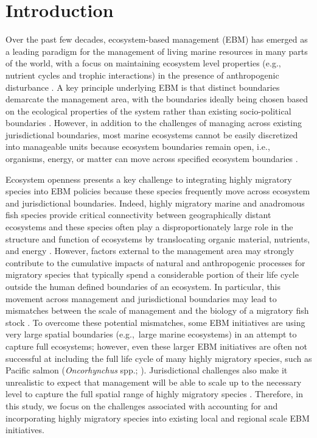 \section{Introduction}

Over the past few decades, ecosystem-based management (EBM) has emerged as a
leading paradigm for the management of living marine resources in many parts of
the world, with a focus on maintaining ecosystem level properties (e.g.,
nutrient cycles and trophic interactions) in the presence of anthropogenic
disturbance \citep{Engler2015, Skjoldal2008, Fletcher2008, Constable2011,
Olsson2008}. A key principle underlying EBM is that distinct boundaries
demarcate the management area, with the boundaries ideally being chosen based on
the ecological properties of the system rather than existing socio-political
boundaries \citep{Long2015, Engler2015}. However, in addition to the challenges
of managing across existing jurisdictional boundaries, most marine ecosystems
cannot be easily discretized into manageable units because ecosystem boundaries
remain open, i.e., organisms, energy, or matter can move across specified
ecosystem boundaries \citep{ONeill2001}.

Ecosystem openness presents a key challenge to integrating highly migratory
species into EBM policies because these species frequently move across ecosystem
and jurisdictional boundaries. Indeed, highly migratory marine and anadromous
fish species provide critical connectivity between geographically distant
ecosystems and these species often play a disproportionately large role in the
structure and function of ecosystems by translocating organic material,
nutrients, and energy \citep{Lundberg2003, Heupel2015}. However, factors
external to the management area may strongly contribute to the cumulative
impacts of natural and anthropogenic processes for migratory species that
typically spend a considerable portion of their life cycle outside the human
defined boundaries of an ecosystem. In particular, this movement across
management and jurisdictional boundaries may lead to mismatches between the
scale of management and the biology of a migratory fish stock \citep{Cash2006a,
Epstein2015}. To overcome these potential mismatches, some EBM initiatives are
using very large spatial boundaries (e.g.,~large marine ecosystems) in an
attempt to capture full ecosystems; however, even these larger EBM initiatives
are often not successful at including the full life cycle of many highly
migratory species, such as Pacific salmon (\emph{Oncorhynchus} spp.;
\citealp{Field2006a, Sherman1999, Wang2004}). Jurisdictional challenges also
make it unrealistic to expect that management will be able to scale up to the
necessary level to capture the full spatial range of highly migratory species
\citep{Cowan2012, Lascelles2014}. Therefore, in this study, we focus on the
challenges associated with accounting for and incorporating highly migratory
species into existing local and regional scale EBM initiatives.

